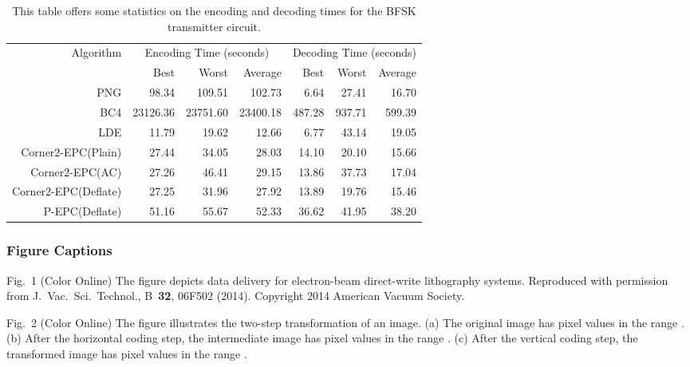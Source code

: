 \documentclass{article}
\begin{document}
\begin{table}
\caption{This table offers some statistics on the encoding and decoding 
times for the BFSK transmitter circuit.}
\begin{center}
\begin{tabular}{ r r r r r r r }
\hline \hline
\multirow{2}{*}{Algorithm}
&\multicolumn{3}{c}{Encoding Time (seconds)}
&\multicolumn{3}{c}{Decoding Time (seconds)}\\
\cline{2-7}
 & Best & Worst & Average & Best & Worst & Average 
\tabularnewline
\hline
PNG & 98.34 & 109.51 & 102.73 & 6.64 & 27.41 & 16.70
\tabularnewline
BC4 & 23126.36 & 23751.60 & 23400.18 & 487.28 & 937.71 & 599.39
\tabularnewline
LDE & 11.79 & 19.62 & 12.66 & 6.77 & 43.14 & 19.05
\tabularnewline
Corner2-EPC(Plain) & 27.44 & 34.05 & 28.03 & 14.10 & 20.10 & 15.66
\tabularnewline
Corner2-EPC(AC) & 27.26 & 46.41 & 29.15 & 13.86 & 37.73 & 17.04
\tabularnewline
Corner2-EPC(Deflate) & 27.25 & 31.96 & 27.92 & 13.89 & 19.76 & 15.46
\tabularnewline
P-EPC(Deflate) & 51.16 & 55.67 & 52.33 & 36.62 & 41.95 & 38.20
\tabularnewline
\hline \hline
\end{tabular}
\end{center}
\end{table}
\newpage 



\newpage 



\subsubsection*{Figure Captions}
\noindent Fig.~1 (Color Online) 
The figure depicts data delivery for electron-beam
direct-write lithography systems. Reproduced with permission from 
J.~Vac.~Sci.~Technol., B~{\bf 32}, 06F502 (2014). Copyright 2014 American
Vacuum Society.

\noindent Fig.~2 (Color Online)
The figure illustrates the two-step transformation 
of an image. (a) The original image has pixel values in 
the range . (b) After the horizontal coding step, the 
intermediate image has pixel values in the range . 
(c) After the vertical coding step, the transformed image has pixel values 
in the range .
\end{document}
